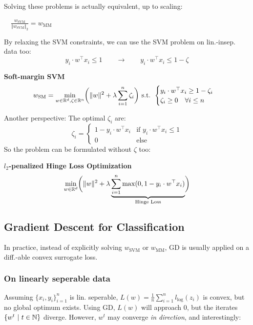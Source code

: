Solving these problems is actually equivalent, up to scaling:

\lemma $\quad\displaystyle\frac{w_\text{SVM}}{\Vert w_\text{SVM} \Vert_2} = w_\text{MM}$

\newpage

By relaxing the SVM constraints, we can use the SVM problem on lin.-insep. data too:
$$
    y_i \cdot w^\top x_i \leq 1 \qquad \to \qquad y_i \cdot w^\top x_i \leq 1 - \zeta
$$

 \textbf{Soft-margin SVM}
$$
    w_\text{SM} = \underset{w\in\mathbb{R}^d,\zeta\in\mathbb{R}^n}{\min}\biggl( \Vert w \Vert^2 + \lambda \sum_{i=1}^{n} \zeta_i \biggr) 
    \text{ s.t. } \begin{cases}
        y_i \cdot w^\top x_i \geq 1-\zeta_i \\
        \zeta_i \geq 0 \quad \forall i \leq n
    \end{cases}
$$

Another perspective: The optimal $\zeta_i$ are:
$$
    \zeta_i = \begin{cases}
        1 - y_i \cdot w^\top x_i    & \text{if } y_i\cdot w^\top x_i \leq 1 \\
        0                           & \text{else}
    \end{cases}
$$
So the problem can be formulated without $\zeta$ too:

 \textbf{$l_2$-penalized Hinge Loss Optimization}
$$
    \underset{w\in\mathbb{R}^d}{\min}\biggl( \Vert w \Vert^2 + \lambda \underbrace{\sum_{i=1}^{n}\max(0, 1-y_i\cdot w^\top x_i)}_\text{Hinge Loss} \biggr)
$$

\newpage

\subsection{Gradient Descent for Classification}

In practice, instead of explicitly solving $w_\text{SVM}$ or $w_\text{MM}$, GD is usually applied on a diff.-able convex surrogate loss.

\subsubsection{On linearly seperable data}

Assuming $\{x_i,y_i\}_{i=1}^n$ is lin. seperable, $L(w) = \frac{1}{n}\sum_{i=1}^{n}l_\text{log}(z_i)$ is convex, but no global optimum exists. 
Using GD, $L(w)$ will approach $0$, but the iterates $\{ w^t \ |\ t \in \mathbb{N} \}$ diverge. However, $w^t$ may converge \textit{in direction}, and interestingly:

